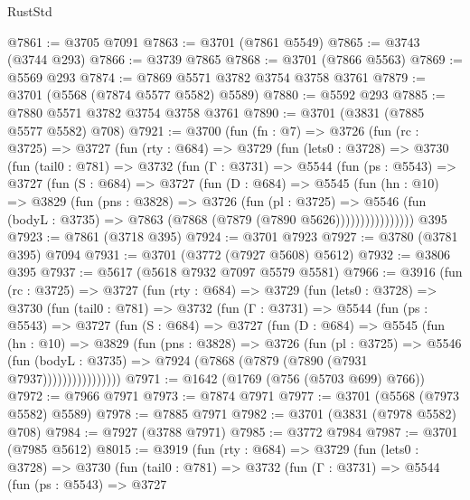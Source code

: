 \begin{lexlean}{RustStd}
\begin{coremodule}
@7861 := @3705 @7091
@7863 := @3701 (@7861 @5549)
@7865 := @3743 (@3744 @293)
@7866 := @3739 @7865
@7868 := @3701 (@7866 @5563)
@7869 := @5569 @293
@7874 := @7869 @5571 @3782 @3754 @3758 @3761
@7879 := @3701 (@5568 (@7874 @5577 @5582) @5589)
@7880 := @5592 @293
@7885 := @7880 @5571 @3782 @3754 @3758 @3761
@7890 := @3701 (@3831 (@7885 @5577 @5582) @708)
@7921 := @3700
    (fun (fn : @7) =>
    @3726
      (fun (rc : @3725) =>
      @3727
        (fun (rty : @684) =>
        @3729
          (fun (lets0 : @3728) =>
          @3730
            (fun (tail0 : @781) =>
            @3732
              (fun (Γ : @3731) =>
              @5544
                (fun (ps : @5543) =>
                @3727
                  (fun (S : @684) =>
                  @3727
                    (fun (D : @684) =>
                    @5545
                      (fun (hn : @10) =>
                      @3829
                        (fun (pns : @3828) =>
                        @3726
                          (fun (pl : @3725) =>
                          @5546
                            (fun (bodyL : @3735) => @7863 (@7868 (@7879 (@7890 @5626))))))))))))))))
    @395
@7923 := @7861 (@3718 @395)
@7924 := @3701 @7923
@7927 := @3780 (@3781 @395) @7094
@7931 := @3701 (@3772 (@7927 @5608) @5612)
@7932 := @3806 @395
@7937 := @5617 (@5618 @7932 @7097 @5579 @5581)
@7966 := @3916
    (fun (rc : @3725) =>
    @3727
      (fun (rty : @684) =>
      @3729
        (fun (lets0 : @3728) =>
        @3730
          (fun (tail0 : @781) =>
          @3732
            (fun (Γ : @3731) =>
            @5544
              (fun (ps : @5543) =>
              @3727
                (fun (S : @684) =>
                @3727
                  (fun (D : @684) =>
                  @5545
                    (fun (hn : @10) =>
                    @3829
                      (fun (pns : @3828) =>
                      @3726
                        (fun (pl : @3725) =>
                        @5546
                          (fun (bodyL : @3735) =>
                          @7924 (@7868 (@7879 (@7890 (@7931 @7937))))))))))))))))
@7971 := @1642 (@1769 (@756 (@5703 @699) @766))
@7972 := @7966 @7971
@7973 := @7874 @7971
@7977 := @3701 (@5568 (@7973 @5582) @5589)
@7978 := @7885 @7971
@7982 := @3701 (@3831 (@7978 @5582) @708)
@7984 := @7927 (@3788 @7971)
@7985 := @3772 @7984
@7987 := @3701 (@7985 @5612)
@8015 := @3919
    (fun (rty : @684) =>
    @3729
      (fun (lets0 : @3728) =>
      @3730
        (fun (tail0 : @781) =>
        @3732
          (fun (Γ : @3731) =>
          @5544
            (fun (ps : @5543) =>
            @3727

\end{coremodule}
\end{lexlean}
